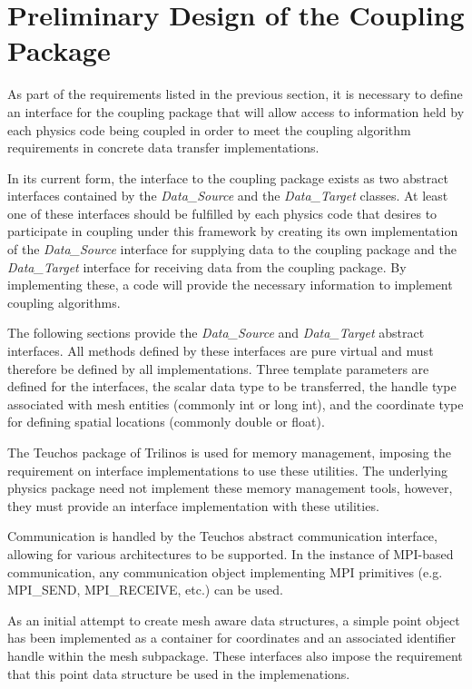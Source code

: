 \documentclass[letterpaper]{article}
\begin{document}
\section{Preliminary Design of the Coupling Package}

As part of the requirements listed in the previous section, it is
necessary to define an interface for the coupling package that will
allow access to information held by each physics code being coupled in
order to meet the coupling algorithm requirements in concrete data
transfer implementations.

In its current form, the interface to the coupling package exists as
two abstract interfaces contained by the {\sl Data\_Source} and the
{\sl Data\_Target} classes. At least one of these interfaces should be
fulfilled by each physics code that desires to participate in coupling
under this framework by creating its own implementation of the {\sl
  Data\_Source} interface for supplying data to the coupling package
and the {\sl Data\_Target} interface for receiving data from the
coupling package. By implementing these, a code will provide the
necessary information to implement coupling algorithms. 

The following sections provide the {\sl Data\_Source} and {\sl
  Data\_Target} abstract interfaces. All methods defined by these
interfaces are pure virtual and must therefore be defined by all
implementations. Three template parameters are defined for the
interfaces, the scalar data type to be transferred, the handle type
associated with mesh entities (commonly int or long int), and the
coordinate type for defining spatial locations (commonly double or float).

The Teuchos package of Trilinos is used for memory management,
imposing the requirement on interface implementations to use these
utilities. The underlying physics package need not implement these
memory management tools, however, they must provide an interface
implementation with these utilities.

Communication is handled by the Teuchos abstract communication
interface, allowing for various architectures to be supported. In the
instance of MPI-based communication, any communication object
implementing MPI primitives (e.g. MPI\_SEND, MPI\_RECEIVE, etc.) can
be used. 

As an initial attempt to create mesh aware data structures, a simple
point object has been implemented as a container for coordinates and
an associated identifier handle within the mesh subpackage. These
interfaces also impose the requirement that this point data structure
be used in the implemenations.
\end{document}
